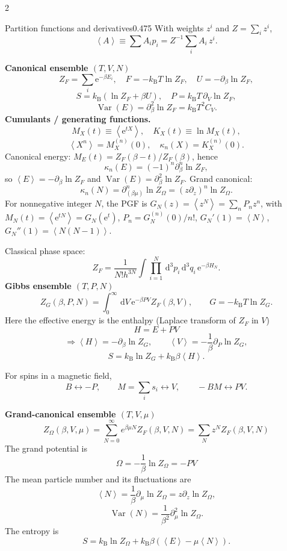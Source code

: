 \documentclass[8pt,a4paper]{extarticle}
\newcommand{\dd}{\,\mathrm d}
\newcommand{\avg}[1]{\left\langle #1\right\rangle}
\newcommand{\Var}{\operatorname{Var}}
\newcommand{\e}{\mathrm e}
\newcommand{\kb}{k_{\mathrm B}}
\begin{document}
\begin{multicols*}{2}
\begin{mytikzbox}{Partition functions and derivatives}{0.475}
With weights \(z^i\) and \(Z=\sum_i z^i\),
\[
\avg A \equiv \sum A_i p_i = Z^{-1}\sum_i A_i\,z^i.
\]

\textbf{Canonical ensemble $(T,V,N)$}
\[
Z_F=\sum_i\e^{-\beta E_i},\quad F=-\kb T\ln Z_F,
\quad U=-\partial_\beta\ln Z_F,
\]
\[
S=\kb(\ln Z_F+\beta U),\quad
P=\kb T\,\partial_V\ln Z_F,
\]
\[
\Var(E)=\partial_\beta^2\ln Z_F=\kb T^2C_V.
\]
\textbf{Cumulants / generating functions.}
\[
M_X(t)\equiv\avg{\e^{tX}},
\quad
K_X(t)\equiv\ln M_X(t),
\]
\[
\avg{X^n}=M_X^{(n)}(0),
\quad
\kappa_n(X)=K_X^{(n)}(0).
\]
Canonical energy: $M_E(t)=Z_F(\beta-t)/Z_F(\beta)$, hence
\[
\kappa_n(E)=(-1)^n\partial_\beta^n\ln Z_F,
\]
so $\avg E=-\partial_\beta\ln Z_F$ and $\Var(E)=\partial_\beta^2\ln Z_F$.
Grand canonical:
\[
\kappa_n(N)=\partial_{(\beta\mu)}^n\ln Z_\Omega=(z\partial_z)^n\ln Z_\Omega.
\]
For nonnegative integer $N$, the PGF is $G_N(z)=\avg{z^N}=\sum_n P_n z^n$,
with $M_N(t)=\avg{\e^{tN}}=G_N(\e^t)$,
$P_n=G_N^{(n)}(0)/n!$,
$G_N'(1)=\avg N$,
$G_N''(1)=\avg{N(N-1)}$.

Classical phase space:
\[
Z_F=\frac1{N!h^{3N}}\int\prod_{i=1}^N\dd^3p_i\dd^3q_i\,
\e^{-\beta H_N}.
\]
\textbf{Gibbs ensemble $(T,P,N)$}
\[
Z_G(\beta,P,N)
=
\int_0^\infty \dd V\,\e^{-\beta PV}Z_F(\beta,V),
\qquad
G=-\kb T\ln Z_G.
\]
Here the effective energy is the enthalpy (Laplace transform of $Z_F$ in $V$)
\[
H=E+PV
\]
\[
\Rightarrow\avg H=-\partial_\beta\ln Z_G,
\qquad
\avg V=-\frac{1}{\beta}\partial_P\ln Z_G,
\]
\[
S=\kb\ln Z_G+\kb\beta\avg H.
\]

For spins in a magnetic field,
\[
B\leftrightarrow -P,
\qquad
M=\sum_i s_i\leftrightarrow V,
\qquad
-BM\leftrightarrow PV.
\]

\textbf{Grand-canonical ensemble $(T,V,\mu)$}
\[
Z_\Omega(\beta,V,\mu)
=
\sum_{N=0}^{\infty} e^{\beta \mu N} Z_F(\beta, V, N)=\sum_{N}z^{N}Z_F(\beta,V,N)
\]
The grand potential is
\[
\Omega = -\frac{1}{\beta} \ln Z_\Omega = -PV
\]
The mean particle number and its fluctuations are
\[
\avg N
=
\frac{1}{\beta}\partial_\mu\ln Z_\Omega
=
z\partial_z\ln Z_\Omega,
\]
\[
\Var(N)
=
\frac{1}{\beta^2}\partial_\mu^2\ln Z_\Omega.
\]
The entropy is
\[
S
=
\kb\ln Z_\Omega
+
\kb\beta\left(\avg E-\mu\avg N\right).
\]
\end{mytikzbox}


\end{multicols*}
\end{document}
